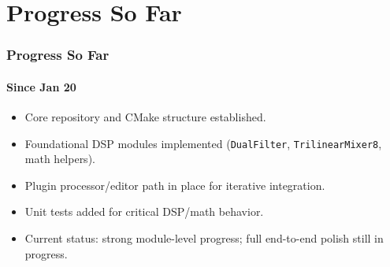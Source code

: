 \section{Progress So Far}

\begin{frame}\frametitle{Progress So Far}\framesubtitle{Since Jan 20}
\begin{itemize} [<+->]
    \item Core repository and CMake structure established.
    \item Foundational DSP modules implemented (\texttt{DualFilter}, \texttt{TrilinearMixer8}, math helpers).
    \item Plugin processor/editor path in place for iterative integration.
    \item Unit tests added for critical DSP/math behavior.
    \item Current status: strong module-level progress; full end-to-end polish still in progress.
\end{itemize}
\end{frame}
